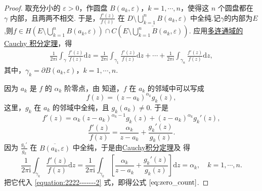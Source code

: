 \documentclass[../../main.tex]{subfiles}
\begin{document}
\begin{proof} 
取充分小的 \( \varepsilon > 0 \)，作圆盘 \( B(a_k, \varepsilon) \)，\( k = 1, \cdots, n \)，使得这 \( n \) 个圆盘都在 \( \gamma \) 内部，且两两不相交. 于是，\( \frac{f'(z)}{f(z)} \) 在 \( D \setminus \bigcup_{k=1}^{n} B(a_k, \varepsilon) \) 中全纯.记$\gamma$的内部为$E$,则$f\in H\left(E\setminus \bigcup_{k=1}^{n} B(a_k, \varepsilon)\right)\cap C\left(\overline{E\setminus \bigcup_{k=1}^{n} B(a_k, \varepsilon)}\right)$. 应用\hyperref[theorem:定理3.2.5]{多连通域的 Cauchy 积分定理}，得
\begin{align}
\frac{1}{2\pi i} \int_{\gamma} \frac{f'(z)}{f(z)} \mathrm{d}z = \frac{1}{2\pi i} \int_{\gamma_1} \frac{f'(z)}{f(z)} \mathrm{d}z + \cdots + \frac{1}{2\pi i} \int_{\gamma_n} \frac{f'(z)}{f(z)} \mathrm{d}z, \label{equation:2222-------2}
\end{align}
其中，\( \gamma_k = \partial B(a_k, \varepsilon) \)，\( k = 1, \cdots, n \).

因为 \( a_k \) 是 \( f \) 的 \( \alpha_k \) 阶零点，由 知道，\( f \) 在 \( a_k \) 的邻域中可以写成
\[
f(z) = (z - a_k)^{\alpha_k} g_k(z),
\]
这里，\( g_k \) 在 \( a_k \) 的邻域中全纯，且 \( g_k(a_k) \neq 0 \). 于是
\[
f'(z) = \alpha_k (z - a_k)^{\alpha_k - 1} g_k(z) + (z - a_k)^{\alpha_k} g_k'(z),
\]
\[
\frac{f'(z)}{f(z)} = \frac{\alpha_k}{z - a_k} + \frac{g_k'(z)}{g_k(z)}.
\]
因为 \( \frac{g_k'}{g_k} \) 在 \( \overline{B(a_k, \varepsilon)} \) 中全纯，于是由\hyperref[theorem:Cauchy-Goursat定理(Cauchy积分定理)]{Cauchy积分定理}及 得
\[
\frac{1}{2\pi \mathrm{i}}\int_{\gamma _k}{\frac{f' (z)}{f(z)}\mathrm{d}z}=\frac{1}{2\pi \mathrm{i}}\int_{\gamma _k}{\left[ \frac{\alpha _k}{z-a_k}+\frac{g_k' (z)}{g_k(z)} \right] \mathrm{d}z}=\alpha _k,\quad k=1,\cdots ,n.
\]
把它代入 \eqref{equation:2222-------2} 式，即得公式 \(\eqref{eq:zero_count}\).

\end{proof}
\end{document}
